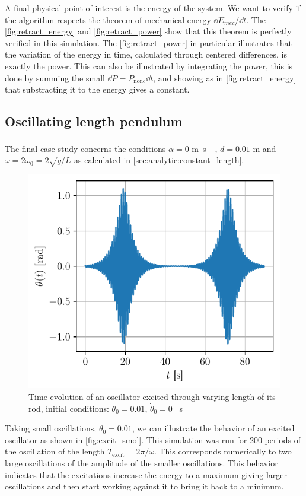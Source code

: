 A final physical point of interest is the energy of the system. We want to verify if the algorithm respects the theorem of mechanical energy $\dd E_{mec}/\dd t$. The \autoref{fig:retract_energy} and \autoref{fig:retract_power} show that this theorem is perfectly verified in this simulation. The \autoref{fig:retract_power} in particular illustrates that the variation of the energy in time, calculated through centered differences, is exactly the power. This can also be illustrated by integrating the power, this is done by summing the small $\dd P = P_\mathrm{nonc} \dd t$, and showing as in \autoref{fig:retract_energy} that substracting it to the energy gives a constant.


\subsection{Oscillating length pendulum}
The final case study concerns the conditions $\alpha=0$ \si{\meter\per\second}, $d=0.01$ \si{\meter} and $\omega = 2\omega_0 = 2\sqrt{g/L}$ as calculated in \autoref{sec:analytic:constant_length}.

\begin{figure}
    \centering
    \includegraphics[width=\linewidth]{figures/excitation_smol_traj.pdf}
    \caption{Time evolution of an oscillator excited through varying length of its rod, initial conditions: \mbox{$\theta_0 = 0.01$}, $\dot{\theta}_0 = 0$ \si{\per\second}}
    \label{fig:excit_smol}
\end{figure}
Taking small oscillations, $\theta_0 = 0.01$, we can illustrate the behavior of an excited oscillator as shown in \autoref{fig:excit_smol}. This simulation was run for 200 periods of the oscillation of the length $T_\mathrm{excit} = 2\pi / \omega$. This corresponds numerically to two large oscillations of the amplitude of the smaller oscillations. This behavior indicates that the excitations increase the energy to a maximum giving larger oscillations and then start working against it to bring it back to a minimum.

